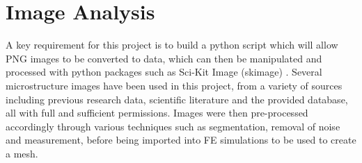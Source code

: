 \documentclass[\report.tex]{subfiles}
\begin{document}
\section{Image Analysis}
\noindent A key requirement for this project is to build a python script which will allow PNG images to be converted to data, which can then be manipulated and processed with python packages such as Sci-Kit Image (skimage) \cite{scikitimage}. Several microstructure images have been used in this project, from a variety of sources including previous research data, scientific literature and the provided database, all with full and sufficient permissions. Images were then pre-processed accordingly through various techniques such as segmentation, removal of noise and measurement, before being imported into FE simulations to be used to create a mesh.
\end{document}
